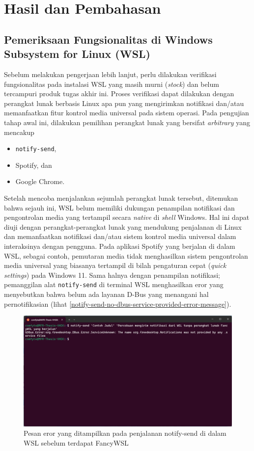 \chapter{Hasil dan Pembahasan}

\section{Pemeriksaan Fungsionalitas di Windows Subsystem for Linux (WSL)}

Sebelum melakukan pengerjaan lebih lanjut, perlu dilakukan verifikasi fungsionalitas pada instalasi WSL yang masih murni (\textit{stock}) dan belum tercampuri produk tugas akhir ini. Proses verifikasi dapat dilakukan dengan perangkat lunak berbasis Linux apa pun yang mengirimkan notifikasi dan/atau memanfaatkan fitur kontrol media universal pada sistem operasi. Pada pengujian tahap awal ini, dilakukan pemilihan perangkat lunak yang bersifat \textit{arbitrary} yang mencakup
\begin{itemize}
    \item \verb|notify-send|,
    \item Spotify, dan
    \item Google Chrome.
\end{itemize}

Setelah mencoba menjalankan sejumlah perangkat lunak tersebut, ditemukan bahwa sejauh ini, WSL belum memiliki dukungan penampilan notifikasi dan pengontrolan media yang tertampil secara \textit{native} di \textit{shell} Windows. Hal ini dapat diuji dengan perangkat-perangkat lunak yang mendukung penjalanan di Linux dan memanfaatkan notifikasi dan/atau sistem kontrol media universal dalam interaksinya dengan pengguna. Pada aplikasi Spotify yang berjalan di dalam WSL, sebagai contoh, pemutaran media tidak menghasilkan sistem pengontrolan media universal yang biasanya tertampil di bilah pengaturan cepat (\textit{quick settings}) pada Windows 11. Sama halnya dengan penampilan notifikasi; pemanggilan alat \verb|notify-send| di terminal WSL menghasilkan eror yang menyebutkan bahwa belum ada layanan D-Bus yang menangani hal pernotifikasian (lihat \autoref{notify-send-no-dbus-service-provided-error-message}).

\begin{figure}
    \centering
    \includegraphics[width=1\linewidth]{assets/Screenshot 2024-01-18 130001.png}
    \caption{Pesan eror yang ditampilkan pada penjalanan notify-send di dalam WSL sebelum terdapat FancyWSL}
    \label{notify-send-no-dbus-service-provided-error-message}
\end{figure}

